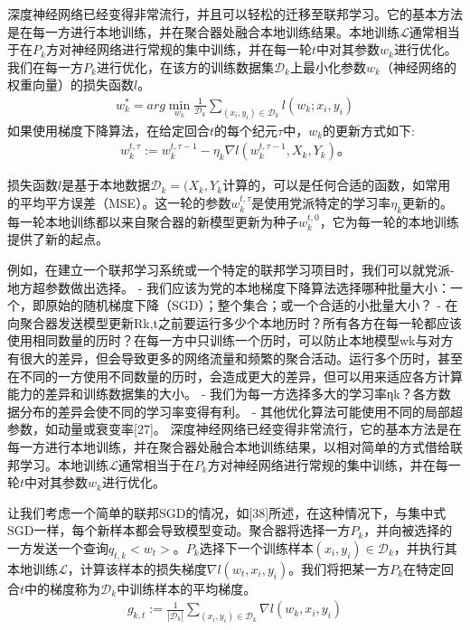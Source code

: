 深度神经网络已经变得非常流行，并且可以轻松的迁移至联邦学习。它的基本方法是在每一方进行本地训练，并在聚合器处融合本地训练结果。本地训练$\mathcal{L}$通常相当于在$P_{k}$方对神经网络进行常规的集中训练，并在每一轮$t$中对其参数$w_{k}$进行优化。我们在每一方$P_{k}$进行优化，在该方的训练数据集$\mathcal{D}_{k}$上最小化参数$w_{k}$（神经网络的权重向量）的损失函数$l$。
\begin{align}
	w^{*}_{k} = arg \min_{w_{k}}\frac{1}{\mathcal{D}_{k}}\sum_{(x_{i}, y_{i}) \in \mathcal{D}_{k}} l(w_{k}; x_{i}, y_{i})
\end{align}
如果使用梯度下降算法，在给定回合$t$的每个纪元$\tau$中，$w_{k}$的更新方式如下:
\begin{align}
	w^{t, \tau}_{k} := w^{t, \tau - 1}_{k} - \eta_{k}\nabla l(w^{t, \tau - 1}_{k}, X_{k}, Y_{k})。
\end{align}

损失函数$l$是基于本地数据$\mathcal{D}_{k} = (X_{k}, Y_{k}$计算的，可以是任何合适的函数，如常用的平均平方误差（MSE）。这一轮的参数$w^{t,\tau}_{k}$是使用党派特定的学习率$\eta_{k}$更新的。每一轮本地训练都以来自聚合器的新模型更新为种子$w^{t, 0}_{k}$，它为每一轮的本地训练提供了新的起点。

例如，在建立一个联邦学习系统或一个特定的联邦学习项目时，我们可以就党派-地方超参数做出选择。
- 我们应该为党的本地梯度下降算法选择哪种批量大小：一个，即原始的随机梯度下降（SGD）；整个集合；或一个合适的小批量大小？
- 在向聚合器发送模型更新Rk,t之前要运行多少个本地历时？所有各方在每一轮都应该使用相同数量的历时？在每一方中只训练一个历时，可以防止本地模型wk与对方有很大的差异，但会导致更多的网络流量和频繁的聚合活动。运行多个历时，甚至在不同的一方使用不同数量的历时，会造成更大的差异，但可以用来适应各方计算能力的差异和训练数据集的大小。
- 我们为每一方选择多大的学习率ηk？各方数据分布的差异会使不同的学习率变得有利。
- 其他优化算法可能使用不同的局部超参数，如动量或衰变率[27]。
深度神经网络已经变得非常流行，它的基本方法是在每一方进行本地训练，并在聚合器处融合本地训练结果，以相对简单的方式借给联邦学习。本地训练$\mathcal{L}$通常相当于在$P_{k}$方对神经网络进行常规的集中训练，并在每一轮$t$中对其参数$w_{k}$进行优化。

让我们考虑一个简单的联邦SGD的情况，如[38]所述，在这种情况下，与集中式SGD一样，每个新样本都会导致模型变动。聚合器将选择一方$P_{k}$，并向被选择的一方发送一个查询$q_{t, k}<w_{t}>$。$P_{k}$选择下一个训练样本$(x_{i}, y_{i}) \in \mathcal{D}_{k}$，并执行其本地训练$\mathcal{L}$，计算该样本的损失梯度$\nabla l(w_{t}, x_{i}, y_{i})$。我们将把某一方$P_{k}$在特定回合$t$中的梯度称为$\mathcal{D}_{k}$中训练样本的平均梯度。
\begin{align}
	g_{k, t} := \frac{1}{|\mathcal{D}_{k}|} \sum_{(x_{i}, y_{i}) \in \mathcal{D}_{k}} \nabla l(w_{k}, x_{i}, y_{i})
\end{align}

